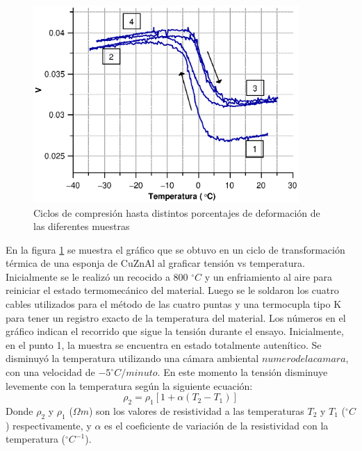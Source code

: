\documentclass[a4paper,12pt,fleqn,twoside,openany]{book}
\begin{document}
 \begin{figure}[h]
 \centering
 \includegraphics[width=0.9\textwidth]{Img/Resultados/Resistencia/Histeresis2.eps}
 \caption{Ciclos de compresión hasta distintos porcentajes de deformación de las diferentes muestras  } 
 \label{fig:Histeresis2}
 \end{figure}

 
 En la figura \ref{fig:Histeresis2} se muestra el gráfico que se obtuvo en un ciclo de transformación térmica de una esponja de CuZnAl al graficar tensión vs temperatura. Inicialmente se le realizó un recocido a 800 $^\circ C$ y un enfriamiento al aire para reiniciar el estado termomecánico del material. Luego se le soldaron los cuatro cables utilizados para el método de las cuatro puntas y una termocupla tipo K para tener un registro exacto de la temperatura del material. Los números en el gráfico indican el recorrido que sigue la tensión durante el ensayo. Inicialmente, en el punto 1, la muestra se encuentra en estado totalmente autenítico. Se disminuyó la temperatura utilizando una cámara ambiental $numero de la camara$, con una velocidad de $-5 ^\circ C/minuto$. En este momento la tensión disminuye levemente con la temperatura según la siguiente ecuación:
 \begin{equation}
 \rho_2 = \rho_1 [1+\alpha (T_2-T_1)] \label{resistividad}
 \end{equation}
 Donde $\rho_2$ y $\rho_1$ ($\Omega m$) son los valores de resistividad a las temperaturas $T_2$ y $T_1$  ($^\circ C$) respectivamente, y $\alpha$ es el coeficiente de variación de la resistividad con la temperatura ($^\circ C ^{-1} $).
 
\end{document}
